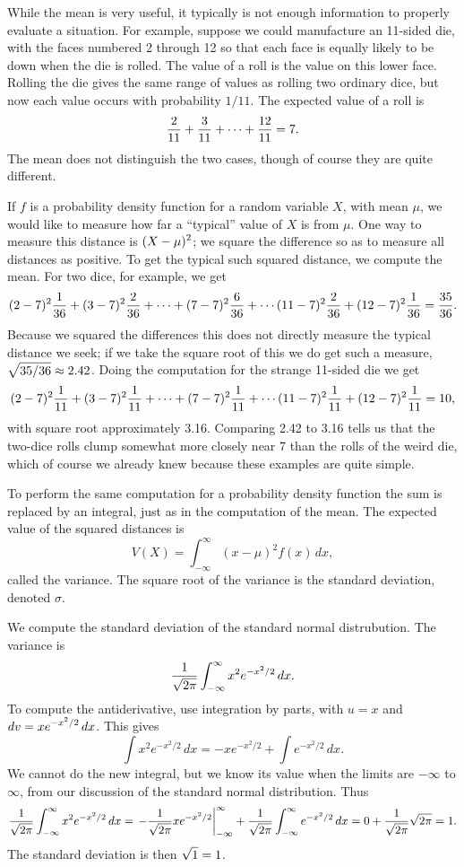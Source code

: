 While the mean is very useful, it typically is not enough information
to properly evaluate a situation. For example, suppose we could
manufacture an 11-sided die, with the faces numbered 2 through 12 so
that each face is equally likely to be down when the die is
rolled. The value of a roll is the value on this lower face.  Rolling
the die gives the same range of values as rolling two ordinary dice,
but now each value occurs with probability $1/11$. The expected value
of a roll is
$$ {2\over 11} + {3\over 11} + \cdots + {12\over 11} = 7.$$
The mean does not distinguish the two cases, though of course they are
quite different.

If $f$ is a probability density function for a random variable $X$,
with mean $\mu$, we would like to measure how far a ``typical'' value
of $X$ is from $\mu$. One way to measure this distance is
$\displaystyle(X-\mu)^2$; we square the difference so as to measure all
distances as positive. To get the typical such squared distance, we
compute the mean. For two dice, for example, we get
$$
  (2-7)^2{1\over 36} + (3-7)^2{2\over 36} + \cdots + (7-7)^2{6\over 36}
  +\cdots (11-7)^2{2\over36} + (12-7)^2{1\over36} = {35\over36}.
$$
Because we squared the differences this does not directly measure the
typical distance we seek; if we take the square root of this we do get
such a measure, $\displaystyle\sqrt{35/36}\approx 2.42$. Doing the computation
for the strange 11-sided die we get
$$
  (2-7)^2{1\over 11} + (3-7)^2{1\over 11} + \cdots + (7-7)^2{1\over 11}
  +\cdots (11-7)^2{1\over11} + (12-7)^2{1\over11} = 10,
$$
with square root approximately 3.16. Comparing 2.42 to 3.16 tells us
that the two-dice rolls clump somewhat more closely near 7
than the rolls of the weird die, which of course we
already knew because these examples are quite simple.

To perform the same computation for a probability density function the
sum is replaced by an integral, just as in the computation of the
mean. The expected value of the squared distances is
$$V(X)= \int_{-\infty }^\infty (x-\mu)^2 f(x)\,dx,$$
called the {\dfont variance\/}. The square root of the
variance is the {\dfont standard deviation\/}, denoted $\sigma$.

\example We compute the standard deviation of the standard normal
distrubution. The variance is
$${1\over\sqrt{2\pi}}\int_{-\infty}^\infty x^2 e^{-x^2/2}\,dx.$$
To compute the antiderivative, use integration by parts, with
$u=x$ and $\displaystyle dv=xe^{-x^2/2}\,dx$. This gives
$$\int x^2 e^{-x^2/2}\,dx = -x e^{-x^2/2}+\int e^{-x^2/2}\,dx.$$
We cannot do the new integral, but we know its value when the limits
are $-\infty$ to $\infty$, from our discussion of the 
standard normal distribution. Thus
$$
  {1\over\sqrt{2\pi}}\int_{-\infty}^\infty x^2 e^{-x^2/2}\,dx=
  \left.-{1\over\sqrt{2\pi}}x e^{-x^2/2}\right|_{-\infty}^\infty + 
  {1\over\sqrt{2\pi}}\int_{-\infty}^\infty e^{-x^2/2}\,dx=
  0+{1\over\sqrt{2\pi}}\sqrt{2\pi}=1.
$$
The standard deviation is then $\displaystyle \sqrt{1}=1$.
\endexample
 
